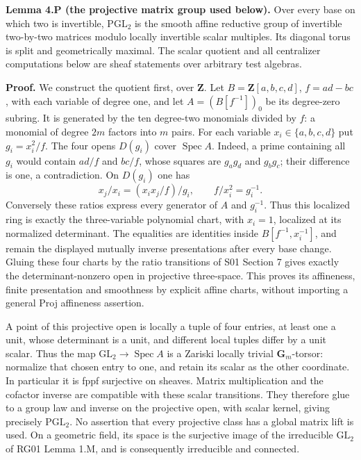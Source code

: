 \documentclass[11pt,a4paper,openany]{report}
\begin{document}
\textbf{Lemma 4.P (the projective matrix group used below).} Over every base on which two is invertible, \(\mathrm{PGL}_2\) is the smooth affine reductive group of invertible two-by-two matrices modulo locally invertible scalar multiples. Its diagonal torus is split and geometrically maximal. The scalar quotient and all centralizer computations below are sheaf statements over arbitrary test algebras.

\textbf{Proof.} We construct the quotient first, over \(\mathbf Z\). Let \(B=\mathbf Z[a,b,c,d]\), \(f=ad-bc\), with each variable of degree one, and let \(A=(B[f^{-1}])_0\) be its degree-zero subring. It is generated by the ten degree-two monomials divided by \(f\): a monomial of degree \(2m\) factors into \(m\) pairs. For each variable \(x_i\in\{a,b,c,d\}\) put \(g_i=x_i^2/f\). The four opens \(D(g_i)\) cover \(\operatorname{Spec}A\). Indeed, a prime containing all \(g_i\) would contain \(ad/f\) and \(bc/f\), whose squares are \(g_ag_d\) and \(g_bg_c\); their difference is one, a contradiction. On \(D(g_i)\) one has \[
 x_j/x_i=(x_ix_j/f)/g_i,\qquad f/x_i^2=g_i^{-1}.
\] Conversely these ratios express every generator of \(A\) and \(g_i^{-1}\). Thus this localized ring is exactly the three-variable polynomial chart, with \(x_i=1\), localized at its normalized determinant. The equalities are identities inside \(B[f^{-1},x_i^{-1}]\), and remain the displayed mutually inverse presentations after every base change. Gluing these four charts by the ratio transitions of S01 Section 7 gives exactly the determinant-nonzero open in projective three-space. This proves its affineness, finite presentation and smoothness by explicit affine charts, without importing a general Proj affineness assertion.

A point of this projective open is locally a tuple of four entries, at least one a unit, whose determinant is a unit, and different local tuples differ by a unit scalar. Thus the map \(\mathrm{GL}_2\to\operatorname{Spec}A\) is a Zariski locally trivial \(\mathbf G_m\)-torsor: normalize that chosen entry to one, and retain its scalar as the other coordinate. In particular it is fppf surjective on sheaves. Matrix multiplication and the cofactor inverse are compatible with these scalar transitions. They therefore glue to a group law and inverse on the projective open, with scalar kernel, giving precisely \(\mathrm{PGL}_2\). No assertion that every projective class has a global matrix lift is used. On a geometric field, its space is the surjective image of the irreducible \(\mathrm{GL}_2\) of RG01 Lemma 1.M, and is consequently irreducible and connected.
\end{document}
